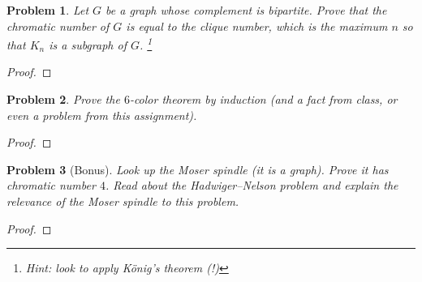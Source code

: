 \documentclass[11pt]{article}
\newtheorem{problem}{Problem}
\begin{document}
\pagebreak 

\begin{problem}Let $G$ be a graph whose complement is bipartite. Prove that the chromatic number of $G$ is equal to the \emph{clique number}, which is the maximum $n$ so that $K_n$ is a subgraph of $G$. \footnote{Hint: look to apply K\"onig's theorem (!)} 
\end{problem}

\begin{proof}

\end{proof}

\pagebreak 

\begin{problem}
Prove the $6$-color theorem by induction (and a fact from class, or even a problem from this assignment). 
\end{problem}

\begin{proof}

\end{proof}

\pagebreak 

\begin{problem}[Bonus]
Look up the Moser spindle (it is a graph). Prove it has chromatic number $4$. Read about the Hadwiger–Nelson problem and explain the relevance of the Moser spindle to this problem. 
\end{problem}

\begin{proof}

\end{proof}
\end{document}
